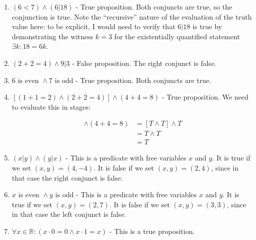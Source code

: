 \begin{solutions}
	
	\begin{enumerate}
		\item $(6 < 7 ) \wedge (6| 18)$ - True proposition. Both conjuncts are true, so the conjunction is true.  Note the ``recursive'' nature of the evaluation of the truth value here:  to be explicit, I would need to verify that $6|18$ is true by demonstrating the witness $k= 3$ for the existentially quantified statement $\exists k : 18 = 6k$.
		\item $(2+2=4) \wedge 9|3$ - False proposition.  The right conjunct is false.
		\item $6 \textrm{ is even } \wedge 7 \textrm{ is odd}$ - True proposition.  Both conjuncts are true.
		\item $[(1+1=2) \wedge (2+2 = 4)] \wedge (4+4 =8)$ - True proposition.  We need to evaluate this in stages:
		
		\begin{align*}
		[(1+1=2) \wedge (2+2 = 4)] \wedge (4+4 =8) &= [T \wedge T] \wedge T\\
		&= T \wedge T\\
		& = T
		\end{align*}
		
		\item $(x|y) \wedge (y|x)$ - This is a predicate with free variables $x$ and $y$.  It is true if we set $(x,y) = (4,-4)$.  It is false if we set $(x,y) = (2,4)$, since in that case the right conjunct is false.
		\item $x \textrm{ is even } \wedge y \textrm{ is odd}$  - This is a predicate with free variables $x$ and $y$. It is true if we set $(x,y) = (2,7)$.  It is false if we set $(x,y) = (3,3)$, since in that case the left conjunct is false.
		\item $\forall x \in \mathbb{R}: (x\cdot 0 = 0 \wedge x \cdot 1 = x)$ - This is a true proposition. 
		

\end{enumerate}
\end{solutions}

